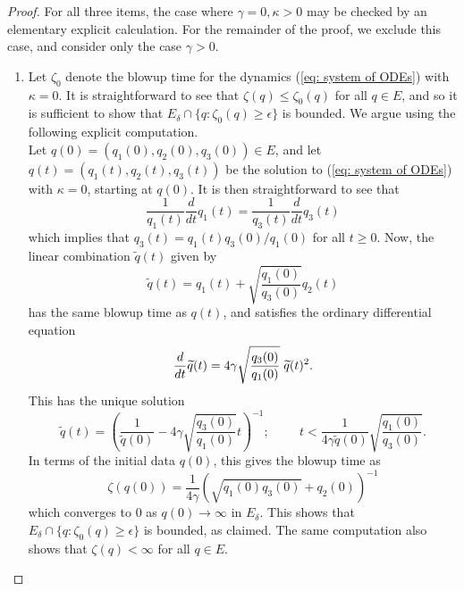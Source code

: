 \begin{proof} For all three items, the case where $\gamma=0, \kappa>0$ may be checked by an elementary explicit calculation. For the remainder of the proof, we exclude this case, and consider only the case $\gamma>0.$ \begin{enumerate}[label=\roman{*}).]
    \item Let $\zeta_0$ denote the blowup time for the dynamics (\ref{eq: system of ODEs}) with $\kappa=0$. It is straightforward to see that $\zeta(q)\le\zeta_0(q)$ for all $q\in E$, and so it is sufficient to show that $E_\delta\cap \{q: \zeta_0(q)\ge \epsilon\}$ is bounded. We argue using the following explicit computation. \medskip \\ Let $q(0)=(q_1(0),q_2(0),q_3(0))\in E$, and let $q(t)=(q_1(t),q_2(t),q_3(t))$ be the solution to (\ref{eq: system of ODEs}) with $\kappa=0$, starting at $q(0)$. It is then straightforward to see that \begin{equation}
        \frac{1}{q_1(t)}\frac{d}{dt}q_1(t)=\frac{1}{q_3(t)}\frac{d}{dt}q_3(t)
    \end{equation} which implies that $q_3(t)=q_1(t)q_3(0)/q_1(0)$ for all $t\ge 0$. Now, the linear combination $\widetilde{q}(t)$ given by \begin{equation}
        \widetilde{q}(t)=q_1(t)+\sqrt{\frac{q_1(0)}{q_3(0)}}q_2(t)
    \end{equation} has the same blowup time as $q(t)$, and satisfies the ordinary differential equation \begin{equation} \frac{d}{dt}\widetilde{q}(t)=4\gamma\sqrt{\frac{q_3(0)}{q_1(0)}}\hspace{0.1cm}\widetilde{q}(t)^2. \end{equation} This has the unique solution \begin{equation} \widetilde{q}(t)=\left(\frac{1}{\widetilde{q}(0)}-4\gamma\sqrt{\frac{q_3(0)}{q_1(0)}}t\right)^{-1}; \hspace{1cm} t< \frac{1}{4\gamma\widetilde{q}(0)}\sqrt{\frac{q_1(0)}{q_3(0)}}. \end{equation} In terms of the initial data $q(0)$, this gives the blowup time as \begin{equation} \zeta(q(0))=\frac{1}{4\gamma}\left(\sqrt{q_1(0)q_3(0)}+q_2(0)\right)^{-1} \end{equation} which converges to $0$ as $q(0)\rightarrow \infty$ in $E_\delta.$ This shows that $E_\delta \cap \{q: \zeta_0(q)\ge \epsilon\}$ is bounded, as claimed. The same computation also shows that $\zeta(q)<\infty$ for all $q\in E$.

\end{enumerate}
\end{proof}
